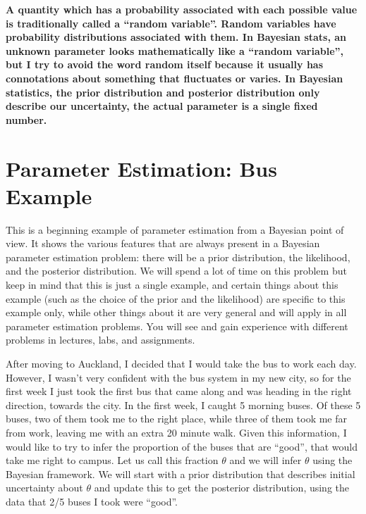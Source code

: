 \begin{framed}
{\bf
A quantity which has a probability associated with each possible value is
traditionally called a ``random variable''. Random variables have probability
distributions associated with them. In Bayesian stats, an unknown
parameter looks mathematically like a ``random variable'', but I try to avoid
the word random itself because it usually has connotations about something that
fluctuates or varies. In Bayesian statistics, the prior distribution and
posterior distribution only describe our uncertainty, the actual parameter is
a single fixed number.}
\end{framed} 

\section{Parameter Estimation: Bus Example}
This is a beginning example of parameter estimation from a Bayesian point of
view. It shows the various features that are always present in a Bayesian
parameter estimation problem: there will be a prior distribution, the likelihood,
and the posterior distribution. We will spend a lot of time on this problem but
keep in mind that this is just a single example, and certain things about this
example (such as the choice of the prior and the likelihood) are specific to
this example only, while other things about it are very general and will apply
in all parameter estimation problems. You will see and gain experience with
different problems in lectures, labs, and assignments.

After moving to Auckland, I decided that I would take the bus to work
each day. However, I wasn't very confident with the bus system in my new city,
so for the first
week I just took the first bus that came along and was heading in the right
direction, towards the city. In the first week, I caught 5 morning buses.
Of these 5 buses, two of them took me to the right place, while three of them
took me far from work, leaving me with an extra 20 minute walk. Given this
information, I would like to try to infer the proportion
of the buses that are ``good'', that would take me right to campus. Let us call
this fraction $\theta$ and we will infer $\theta$ using the Bayesian framework.
We will start with a prior distribution that describes initial uncertainty about
$\theta$ and update this to get the posterior distribution, using the data that
2/5 buses I took were ``good''.

